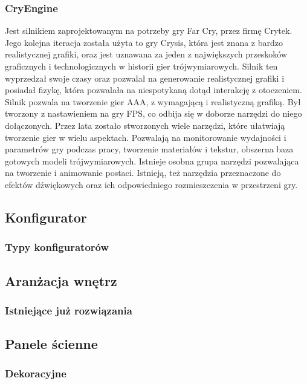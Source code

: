 \documentclass{article} %
\begin{document}
        \subsubsection*{CryEngine}
        Jest silnikiem zaprojektowanym na potrzeby gry Far Cry, przez firmę Crytek. Jego kolejna iteracja została użyta to gry Crysis, która jest znana z bardzo realistycznej grafiki, oraz jest uznawana za jeden z największych przeskoków graficznych i technologicznych w historii gier trójwymiarowych. Silnik ten wyprzedzał swoje czasy oraz pozwalał na generowanie realistycznej grafiki i posiadał fizykę, która pozwalała na niespotykaną dotąd interakcję z otoczeniem. 
        \\
        
        Silnik pozwala na tworzenie gier AAA, z wymagającą i realistyczną grafiką. Był tworzony z nastawieniem na gry FPS, co odbija się w doborze narzędzi do niego dołączonych. Przez lata zostało stworzonych wiele narzędzi, które ułatwiają tworzenie gier w wielu aspektach. Pozwalają na monitorowanie wydajności i parametrów gry podczas pracy, tworzenie materiałów i tekstur, obszerna baza gotowych modeli trójwymiarowych. Istnieje osobna grupa narzędzi pozwalająca na tworzenie i animowanie postaci. Istnieją, też narzędzia przeznaczone do efektów dźwiękowych oraz ich odpowiedniego rozmieszczenia w przestrzeni gry.
        \\
        
        
        
    \subsection{Konfigurator}
        \subsubsection{Typy konfiguratorów}
    
    \subsection{Aranżacja wnętrz}
        \subsubsection{Istniejące już rozwiązania}
    \subsection{Panele ścienne}
        \subsubsection{Dekoracyjne}
\end{document}
